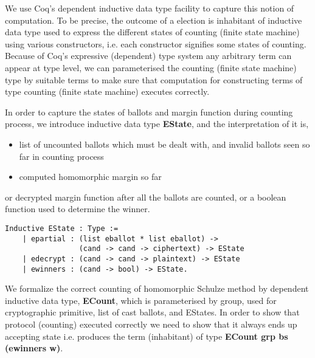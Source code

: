 \documentclass{llncs}
\begin{document}
We use Coq's dependent inductive data type facility to capture 
this notion of computation. To  be precise, the outcome
  of a election
 is inhabitant of inductive data type used to express the 
  different states of counting (finite state machine) using various constructors, 
  i.e. each constructor signifies some states of counting. Because of Coq's
  expressive (dependent) type system any arbitrary term can appear at type level, 
  we can  parameterised the counting (finite state machine) type by suitable 
  terms to  make sure that computation for constructing terms of type counting (finite 
  state machine) executes correctly.
 
  
 
 In order to capture the states of ballots and margin function during counting process, 
 we introduce inductive data type \textbf{EState}, and the interpretation of it is,  
  \begin{itemize}
  \item list of uncounted ballots which must be dealt with, 
  	and invalid ballots seen so far in counting process
  \item computed homomorphic margin so far
  \end{itemize}
  or decrypted margin function after all the ballots are counted, 
  or a boolean function used to determine the winner.
  
  
  
\begin{verbatim}
Inductive EState : Type :=
    | epartial : (list eballot * list eballot) ->
                 (cand -> cand -> ciphertext) -> EState
    | edecrypt : (cand -> cand -> plaintext) -> EState
    | ewinners : (cand -> bool) -> EState.
\end{verbatim}

We formalize the correct counting of homomorphic Schulze method by dependent inductive 
data type, \textbf{ECount}, which is parameterised by group, used for cryptographic 
primitive, list of cast ballots, and EStates. In order to show that protocol (counting)
 executed correctly we need to show that it always ends up accepting state i.e. 
 produces the term (inhabitant) of type \textbf{ECount grp bs (ewinners w)}.
\end{document}
